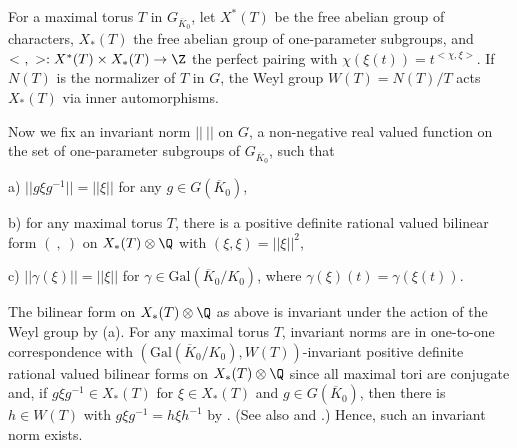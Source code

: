\begin{apppara}
 For a maximal torus $T$ in $G_{\overline{K}_0}$,
 let $X^*(T)$ be the free abelian group of characters,
 $X_*(T)$ the free abelian group of one-parameter subgroups,
 and $<\ , \ > : X^*(T) \times X_*(T) \rightarrow \Z$
 the perfect pairing with $\chi(\xi(t)) = t^{<\chi, \xi>}$.
 If $N(T)$ is the normalizer of $T$ in $G$, the Weyl group $W(T) = N(T)/T$
 acts $X_*(T)$ via inner automorphisms.

 Now we fix an invariant norm $||\ ||$ on $G$, a non-negative
 real valued function on the set of one-parameter subgroups
 of $G_{\overline{K}_0}$, such that

 a) $||g \xi g^{-1}|| = ||\xi||$ for any $g \in G(\overline{K}_0)$,

 b) for any maximal torus $T$, there is a positive definite rational valued
 bilinear form $(\ , \ )$ on $X_*(T) \otimes \Q$
 with $(\xi, \xi) = ||\xi||^2$,

 c) $||\gamma(\xi)|| = ||\xi||$
 for $\gamma \in \mathrm{Gal}(\overline{K}_0/K_0)$,
 where $\gamma(\xi)(t) = \gamma(\xi(t))$.

 \noindent
 The bilinear form on $X_*(T) \otimes \Q$
 as above is invariant under the action of
 the Weyl group by (a). For any maximal torus $T$,
 invariant norms are in one-to-one correspondence
 with $(\mathrm{Gal}(\overline{K}_0/K_0), W(T))$-invariant positive definite
 rational valued bilinear forms on $X_*(T) \otimes \Q$ since
 all maximal tori are conjugate and, if $g \xi g^{-1} \in X_*(T)$ for
 $\xi \in X_*(T)$ and $g \in G(\overline{K}_0)$, then there is $h \in W(T)$
 with $g \xi g^{-1} = h \xi h^{-1}$ by \cite{git}.
 (See also \cite{iiit} and \cite{tpipht}.) Hence, such an invariant norm exists.
\end{apppara}

